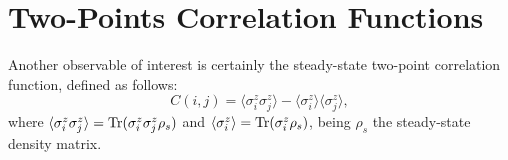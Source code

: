 






\section{Two-Points Correlation Functions}
Another observable of interest is certainly the steady-state two-point correlation function, defined as follows:
\begin{equation}
    C(i, j) = \langle \sigma^z_i \sigma^z_j \rangle - \langle \sigma^z_i \rangle \langle \sigma^z_j \rangle,
\end{equation}
where $\langle \sigma^z_i \sigma^z_j \rangle = \operatorname{Tr}(\sigma^z_i \sigma^z_j \rho_{s})$ and $\langle \sigma^z_i \rangle = \operatorname{Tr}(\sigma^z_i \rho_{s})$, being $\rho_{s}$ the steady-state density matrix.

